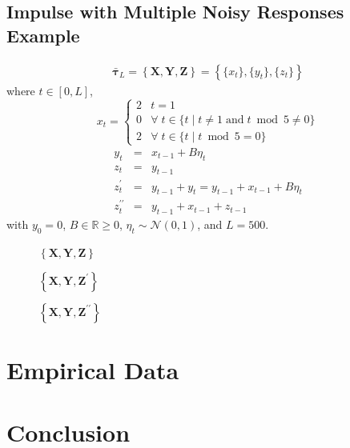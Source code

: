 \documentclass[a4paper,11pt,twocolumn]{article}
\begin{document}
\subsection{Impulse with Multiple Noisy Responses Example}
\begin{eqnarray}
\bar{\mathbf{\tau}}_L = \left\{\mathbf{X},\mathbf{Y},\mathbf{Z}\right\} = \left\{\{x_t\},\{y_t\},\{z_t\}\right\}
\end{eqnarray}
where $t\in[0,L]$,
\begin{equation*}
x_t = \left\{
  \begin{array}{lr}
    2 & t = 1\\
    0 & \forall\; t\in\{t\;|\;t\neq 1 \;\mathrm{and}\; t\bmod 5 \neq 0\}\\
    2 & \forall\; t\in\{t\;|\;t\bmod 5 = 0\}
  \end{array}
\right.
\end{equation*}
\begin{eqnarray*}
y_t &=& x_{t-1} + B\eta_t\\
z_t &=& y_{t-1}\\
z_t^\prime &=& y_{t-1} + y_t = y_{t-1} + x_{t-1} + B\eta_t\\
z_t^{\prime\prime} &=& y_{t-1} + x_{t-1} + z_{t-1}
\end{eqnarray*}
with $y_0 = 0$, $B\in\mathbb{R}\ge 0$, $\eta_t\sim\mathcal{N}\left(0,1\right)$, and $L=500$.
\begin{figure}[ht]
\caption{$\left\{\mathbf{X},\mathbf{Y},\mathbf{Z}\right\}$}
\end{figure}
\begin{figure}[ht]
\caption{$\left\{\mathbf{X},\mathbf{Y},\mathbf{Z}^\prime\right\}$}
\end{figure}
\begin{figure}[ht]
\caption{$\left\{\mathbf{X},\mathbf{Y},\mathbf{Z}^{\prime\prime}\right\}$}
\end{figure}

\section{Empirical Data}

\section{Conclusion}

%
%
\end{document}
